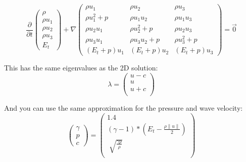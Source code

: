 \documentclass[12pt,letterpaper]{article}
\begin{document}
\begin{equation*}
    \frac{\partial}{\partial t}\left(
        \begin{array}{lr}
                    \rho \\
                    \rho u_1 \\
                    \rho u_2 \\
                    \rho u_3 \\
                    E_t 
        \end{array} \right) +
    \nabla
        \begin{pmatrix}
            \rho u_1          & \rho u_2            & \rho u_3\\
            \rho u_1^2 + p    & \rho u_1 u_2        & \rho u_1 u_3 \\
            \rho u_2 u_1      & \rho u_2^2 + p      & \rho u_2 u_3 \\
            \rho u_3 u_1      & \rho u_3 u_2 + p    & \rho u_3^2 + p \\
            (E_t + p) u_1     & (E_t + p) u_2       & (E_t + p) u_3
        \end{pmatrix}  = \vec{0}
\end{equation*}

This has the same eigenvalues as the 2D solution:
\begin{equation*}
    \lambda = \left( \begin{array}{lr}
                     u-c \\
                     u \\
                     u+c \\
        \end{array} \right)
\end{equation*}

And you can use the same approximation for the pressure and wave velocity:
\begin{equation*}
    \left( \begin{array}{lr}
            \gamma \\ 
            p \\ 
            c \end{array} \right) =
    \left( \begin{array}{lr}
                     1.4 \\
                     (\gamma - 1) * ( E_t - \frac{\rho \|u\|}{2} ) \\
                    \sqrt[]{\frac{\gamma  p}{\rho}} \\
        \end{array} \right)
\end{equation*}
\end{document}
